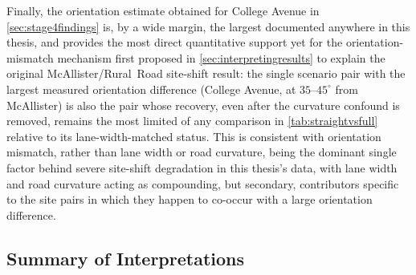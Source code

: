 \documentclass{iutbscthesis}
\begin{document}
Finally, the orientation estimate obtained for College Avenue in \autoref{sec:stage4findings} is, by a wide margin, the largest documented anywhere in this thesis, and provides the most direct quantitative support yet for the orientation-mismatch mechanism first proposed in \autoref{sec:interpretingresults} to explain the original McAllister/Rural~Road site-shift result: the single scenario pair with the largest measured orientation difference (College Avenue, at $35$--$45^\circ$ from McAllister) is also the pair whose recovery, even after the curvature confound is removed, remains the most limited of any comparison in \autoref{tab:straightvsfull} relative to its lane-width-matched status. This is consistent with orientation mismatch, rather than lane width or road curvature, being the dominant single factor behind severe site-shift degradation in this thesis's data, with lane width and road curvature acting as compounding, but secondary, contributors specific to the site pairs in which they happen to co-occur with a large orientation difference.

\subsection{Summary of Interpretations}
\end{document}
